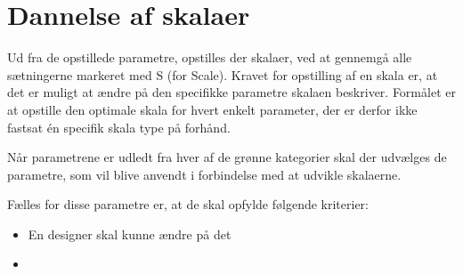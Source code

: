 \section{Dannelse af skalaer}
\label{ParametreDatabehandlingSkalaer}
%
Ud fra de opstillede parametre, opstilles der skalaer, ved at gennemgå alle sætningerne markeret med S (for Scale). Kravet for opstilling af en skala er, at det er muligt at ændre på den specifikke parametre skalaen beskriver. Formålet er at opstille den optimale skala for hvert enkelt parameter, der er derfor ikke fastsat én specifik skala type på forhånd. 







Når parametrene er udledt fra hver af de grønne kategorier skal der udvælges de parametre, som vil blive anvendt i forbindelse med at udvikle skalaerne. 

Fælles for disse parametre er, at de skal opfylde følgende kriterier: \blankline
%
\begin{itemize}
  \item En designer skal kunne ændre på det
  \item 
\end{itemize}



